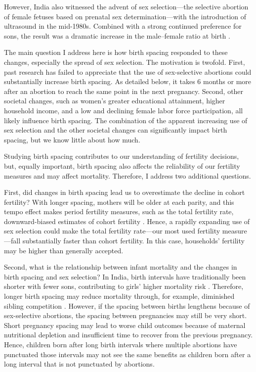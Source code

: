 \documentclass[12pt,letterpaper]{article}
\begin{document}
However, India also witnessed the advent of sex selection---the selective abortion of 
female fetuses based on prenatal sex determination---with the introduction of ultrasound 
in the mid-1980s.
Combined with a strong continued preference for sons, the result was a dramatic increase 
in the male--female ratio at birth
\citep{das_gupta97,Arnold2002,retherford03b,Guilmoto2012,Portner2015b,Jayachandran2017}.


The main question I address here is how birth spacing responded to these changes, 
especially the spread of sex selection. 
The motivation is twofold.
First, past research has failed to appreciate that the use of sex-selective abortions could 
substantially increase birth spacing. 
As detailed below, it takes 6 months or more after an abortion to reach the same point in 
the next pregnancy. 
Second, other societal changes, such as women's greater educational attainment, higher 
household income, and a low and declining female labor force participation, all 
likely influence birth spacing. 
The combination of the apparent increasing use of sex selection and the other societal 
changes can significantly impact birth spacing, but we know little about how much.

Studying birth spacing contributes to our understanding of fertility decisions, but, equally 
important, birth spacing also affects the reliability of our fertility measures and may 
affect mortality. 
Therefore, I address two additional questions. 

First, did changes in birth spacing lead us to overestimate the decline in cohort fertility?
With longer spacing, mothers will be older at each parity, and this tempo effect 
makes period fertility measures, such as the total fertility rate, downward-biased
estimates of cohort fertility \citep{Hotz1997,Bongaarts1999,Ni-Bhrolchain2011}.
Hence, a rapidly expanding use of sex selection could make the total fertility rate---our 
most used fertility measure---fall substantially faster than cohort fertility.
In this case, households' fertility may be higher than generally accepted.

Second, what is the relationship between infant mortality and the changes in birth spacing
and sex selection? 
In India, birth intervals have traditionally been shorter with fewer sons, contributing to 
girls' higher mortality risk
\citep{Whitworth2002,Bhalotra2008,Maitra2008,Jayachandran2011,Jayachandran2017a}. 
Therefore, longer birth spacing may reduce mortality through, for example, diminished 
sibling competition \citep{Conde-Agudelo2012,Molitoris2019}. 
However, if the spacing between births lengthens because of sex-selective abortions, the 
spacing between pregnancies may still be very short. 
Short pregnancy spacing may lead to worse child outcomes because of maternal nutritional 
depletion and insufficient time to recover from the previous pregnancy. 
Hence, children born after long birth intervals where multiple abortions have punctuated 
those intervals may not see the same benefits as children born after a long interval that 
is not punctuated by abortions.
\end{document}
